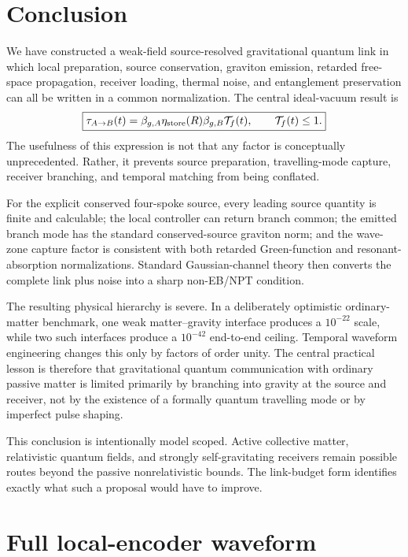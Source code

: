 \documentclass[11pt]{article}
\begin{document}
\section{Conclusion}

We have constructed a weak-field source-resolved gravitational quantum link in which local preparation, source conservation, graviton emission, retarded free-space propagation, receiver loading, thermal noise, and entanglement preservation can all be written in a common normalization. The central ideal-vacuum result is
\begin{equation}
\boxed{
\tau_{A\to B}(t)
=
\beta_{g,A}
\eta_{\rm store}(R)
\beta_{g,B}
\mathcal T_f(t),
\qquad
\mathcal T_f(t)\le1.
}
\end{equation}
The usefulness of this expression is not that any factor is conceptually unprecedented. Rather, it prevents source preparation, travelling-mode capture, receiver branching, and temporal matching from being conflated.

For the explicit conserved four-spoke source, every leading source quantity is finite and calculable; the local controller can return branch common; the emitted branch mode has the standard conserved-source graviton norm; and the wave-zone capture factor is consistent with both retarded Green-function and resonant-absorption normalizations. Standard Gaussian-channel theory then converts the complete link plus noise into a sharp non-EB/NPT condition.

The resulting physical hierarchy is severe. In a deliberately optimistic ordinary-matter benchmark, one weak matter--gravity interface produces a $10^{-22}$ scale, while two such interfaces produce a $10^{-42}$ end-to-end ceiling. Temporal waveform engineering changes this only by factors of order unity. The central practical lesson is therefore that gravitational quantum communication with ordinary passive matter is limited primarily by branching into gravity at the source and receiver, not by the existence of a formally quantum travelling mode or by imperfect pulse shaping.

This conclusion is intentionally model scoped. Active collective matter, relativistic quantum fields, and strongly self-gravitating receivers remain possible routes beyond the passive nonrelativistic bounds. The link-budget form identifies exactly what such a proposal would have to improve.

\appendix

\section{Full local-encoder waveform}
\end{document}
